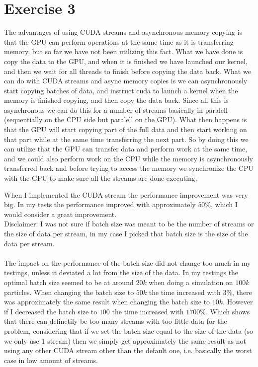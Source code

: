 \documentclass[a4paper, 12pt]{article}
\begin{document}


\section{Exercise 3}
The advantages of using CUDA streams and asynchronous memory copying is that the GPU can perform operations at the same time as it is transferring memory, but so far we have not been utilizing this fact. What we have done is copy the data to the GPU, and when it is finished we have launched our kernel, and then we wait for all threads to finish before copying the data back. What we can do with CUDA streams and async memory copies is we can asynchronously start copying batches of data, and instruct cuda to launch a kernel when the memory is finished copying, and then copy the data back. Since all this is asynchronous we can do this for a number of streams basically in paralell (sequentially on the CPU side but paralell on the GPU). What then happens is that the GPU will start copying part of the full data and then start working on that part while at the same time transferring the next part. So by doing this we can utilize that the GPU can transfer data and perform work at the same time, and we could also perform work on the CPU while the memory is asynchronously transferred back and before trying to access the memory we synchronize the CPU with the GPU to make sure all the streams are done executing.

When I implemented the CUDA stream the performance improvement was very big. In my tests the performance improved with approximately $50\%$, which I would consider a great improvement.\\

Disclaimer: I was not sure if batch size was meant to be the number of streams or the size of data per stream, in my case I picked that batch size is the size of the data per stream.
\\\\
The impact on the performance of the batch size did not change too much in my testings, unless it deviated a lot from the size of the data. In my testings the optimal batch size seemed to be at around $20k$ when doing a simulation on $100k$ particles. When changing the batch size to $50k$ the time increased with $3\%$, there was approximately the same result when changing the batch size to $10k$. However if I decreased the batch size to $100$ the time increased with $1700\%$. Which shows that there can definetily be too many streams with too little data for the problem, considering that if we set the batch size equal to the size of the data (so we only use 1 stream) then we simply get approximately the same result as not using any other CUDA stream other than the default one, i.e. basically the worst case in low amount of streams.
\end{document}
